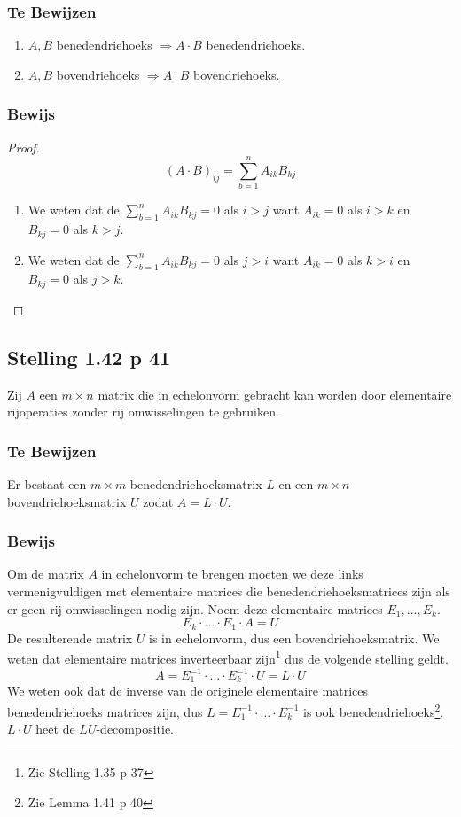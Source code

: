 \documentclass[lineaire_algebra_oplossingen.tex]{subfiles}
\begin{document}
\subsubsection*{Te Bewijzen}
\begin{enumerate}
\item $A,B$ benedendriehoeks $\Rightarrow A\cdot B$ benedendriehoeks.
\item $A,B$ bovendriehoeks $\Rightarrow A\cdot B$ bovendriehoeks.
\end{enumerate}

\subsubsection*{Bewijs}
\begin{proof}
\[
(A\cdot B)_{ij} = \sum_{b=1}^nA_{ik}B_{kj} 
\]
\begin{enumerate}
\item We weten dat de  $\sum_{b=1}^nA_{ik}B_{kj} = 0$ als $i>j$ want $A_{ik} = 0$ als $i>k$ en $B_{kj}=0$ als $k>j$.
\item We weten dat de  $\sum_{b=1}^nA_{ik}B_{kj} = 0$ als $j>i$ want $A_{ik} = 0$ als $k>i$ en $B_{kj}=0$ als $j>k$.
\end{enumerate}
\end{proof}


\subsection{Stelling 1.42 p 41}
\label{1.42}
Zij $A$ een $m\times n$ matrix die in echelonvorm gebracht kan worden door elementaire rijoperaties zonder rij omwisselingen te gebruiken.

\subsubsection*{Te Bewijzen}
Er bestaat een $m\times m$ benedendriehoeksmatrix $L$ en een $m\times n$ bovendriehoeksmatrix $U$ zodat $A = L\cdot U$.

\subsubsection*{Bewijs}
Om de matrix $A$ in echelonvorm te brengen moeten we deze links vermenigvuldigen met elementaire matrices die benedendriehoeksmatrices zijn als er geen rij omwisselingen nodig zijn. Noem deze elementaire matrices $E_1,...,E_k$.
\[
E_k\cdot ... \cdot E_1 \cdot A = U
\]
De resulterende matrix $U$ is in echelonvorm, dus een bovendriehoeksmatrix. We weten dat elementaire matrices inverteerbaar zijn\footnote{Zie Stelling 1.35 p 37} dus de volgende stelling geldt.
\[
A = E_1^{-1}\cdot ...\cdot E_k^{-1} \cdot U = L\cdot U
\]
We weten ook dat de inverse van de originele elementaire matrices benedendriehoeks matrices zijn, dus $L = E_1^{-1}\cdot ...\cdot E_k^{-1}$ is ook benedendriehoeks\footnote{Zie Lemma 1.41 p 40}.
$L\cdot U$ heet de $LU$-decompositie.
\end{document}
